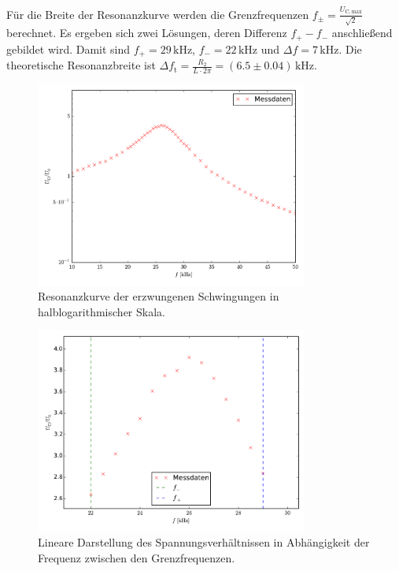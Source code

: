 Für die Breite der Resonanzkurve werden die Grenzfrequenzen $f_\pm=\frac{U_\mathup{C,max}}{\sqrt{2}}$ berechnet. Es ergeben sich zwei Lösungen, deren Differenz $f_+-f_-$ anschließend gebildet wird. 
Damit sind $f_+=29\,\si{\kilo\hertz}$, $f_-=22\,\si{\kilo\hertz}$ und $\Delta{f}=7\,\si{\kilo\hertz}$. 
Die theoretische Resonanzbreite ist $\Delta{f_\mathup{t}}=\frac{R_2}{L\cdot2\pi}=(6.5\pm0.04)\,\si{\kilo\hertz}$. 
\begin{figure}[h]
		\centering
		\includegraphics[width=0.8\textwidth]{build/plot_amplitude_semilog.pdf}
		\caption{Resonanzkurve der erzwungenen Schwingungen in halblogarithmischer Skala.\cite{matplotlib}}
\end{figure}
\begin{figure}[h]
		\centering
		\includegraphics[width=0.8\textwidth]{build/plot_amplitude_linear.pdf}
		\caption{Lineare Darstellung des Spannungsverhältnissen in Abhängigkeit der Frequenz zwischen den Grenzfrequenzen.\cite{matplotlib}}
\end{figure}

